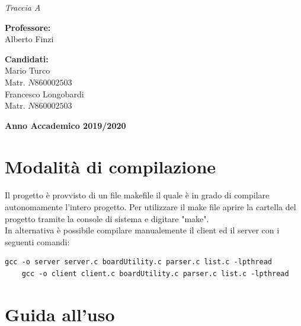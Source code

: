 \documentclass[a4paper]{article}
\begin{document}
\begin{titlepage}
\begin{center}
    {{ \textit{Traccia A}}}
\end{center}
\vspace{25mm}
\par
\noindent
\begin{minipage}[t]{0.47\textwidth}
    \textbf{Professore:}\\
    Alberto Finzi\\   
\end{minipage}
\hfill
\begin{minipage}[t]{0.47\textwidth}\raggedleft
    \textbf{Candidati:}\\
    Mario Turco\\ 
    Matr. $N860002503$\\
    Francesco Longobardi\\
    Matr.  $N860002503$\\
\end{minipage}
\vspace{5.5mm}
\begin{center}
    {\large{\bf Anno Accademico 2019/2020}} 
\end{center}
\end{titlepage}


\thispagestyle{empty}\null\newpage
\tableofcontents
\newpage
{}

\section{Modalità di compilazione}
\paragraph{}
Il progetto è provvisto di un file makefile il quale è in grado di compilare autonomamente l'intero progetto.
Per utilizzare il make file aprire la cartella del progetto tramite la console di sistema e digitare "make".\\
In alternativa è possibile compilare manualemente il client ed il server con i seguenti comandi:\\

\begin{Verbatim}[fontsize=\small]
    gcc -o server server.c boardUtility.c parser.c list.c -lpthread
    gcc -o client client.c boardUtility.c parser.c list.c -lpthread
\end{Verbatim}
\section{Guida all'uso }
\end{document}
